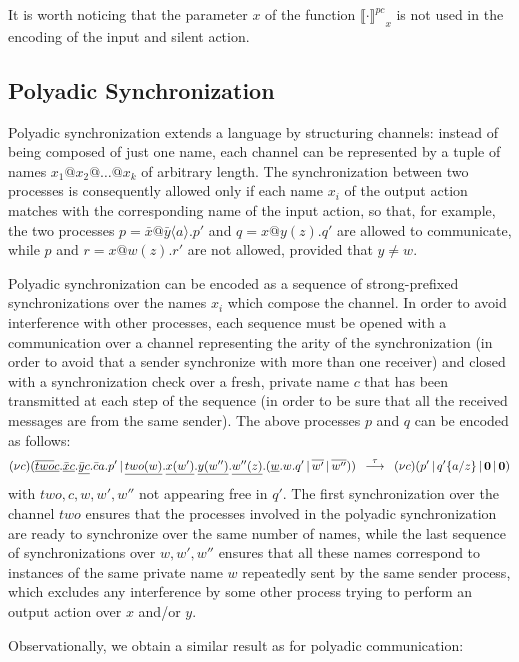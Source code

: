 \documentclass[submission,copyright,creativecommons]{eptcs}
\newcommand{\sost}[2]{\mbox{$\{#1/#2\}$}}
\newcommand{\deriv}[1]{{\mbox{${\:\stackrel{#1}{\longrightarrow}\:}$}}}
\newcommand{\restr}[1]{\mbox{$({\bf\nu} #1)$}}
\newcommand{\para}{\mbox{$\,|\,$}}
\newcommand{\nil}{\mbox{\bf 0}}
\newcommand{\encoding}[2]{\ensuremath{\llbracket #2 \rrbracket^{#1}}}
\begin{document}
It is worth noticing that the parameter $x$ of the function $\encoding {pc} \cdot _x$ is not used in the encoding of the 
input and silent action.



\subsection{Polyadic Synchronization}
Polyadic synchronization \cite{CM03} extends a language by structuring channels: instead of being composed of just one name,
each channel can be represented by a tuple of names $x_1@x_2@\ldots@x_k$ of arbitrary length. 
The synchronization between two processes is consequently allowed only if each name $x_i$ of the output action matches with the
corresponding name of the input action, so that, for example, the two processes $p = \bar{x}@\bar{y}\langle a \rangle.p'$ and $q = x@y(z).q'$ are allowed to communicate, while $p$ and $r = x@w(z).r'$ are not allowed, provided that $y \neq w$.

Polyadic synchronization can be encoded as a sequence of strong-prefixed synchronizations over the names $x_i$ which compose the channel.
In order to avoid interference with other processes, each sequence must be opened with a communication 
over a channel representing the arity of the synchronization (in order to avoid that a sender synchronize with more than one receiver) 
and closed with a synchronization check over a fresh, private name $c$ that has been transmitted at each step of the sequence (in 
order to be sure that all the received messages are from the same sender). The above processes $p$ and $q$ can be encoded as follows:
\[ \restr{c} (\underline{\overline{two}c}.\underline{\bar{x}c}.\underline{\bar{y}c}.\bar{c}a.p' \para \underline{two(w)}.\underline{x(w')}.\underline{y(w'')}.\underline{w''(z)}.(\underline{w}.w.q' \para \overline{w'} \para \overline{w''})) \; \; \deriv{\tau}  \; \;
\restr{c} (p' \para q'\sost{a}{z} \para \nil \para \nil)
\]
with $two, c, w, w', w''$ not appearing free in $q'$. The first synchronization over the channel $two$ ensures that the processes involved in the polyadic synchronization are ready to synchronize over the same number of names, while the last sequence of synchronizations over $w, w', w''$ ensures that all these names correspond to instances of the same private name $w$ repeatedly sent by the same sender process, which excludes any interference by some other process trying to perform an output action over $x$ and/or $y$.

Observationally, we obtain a similar result as for polyadic communication:
\end{document}
